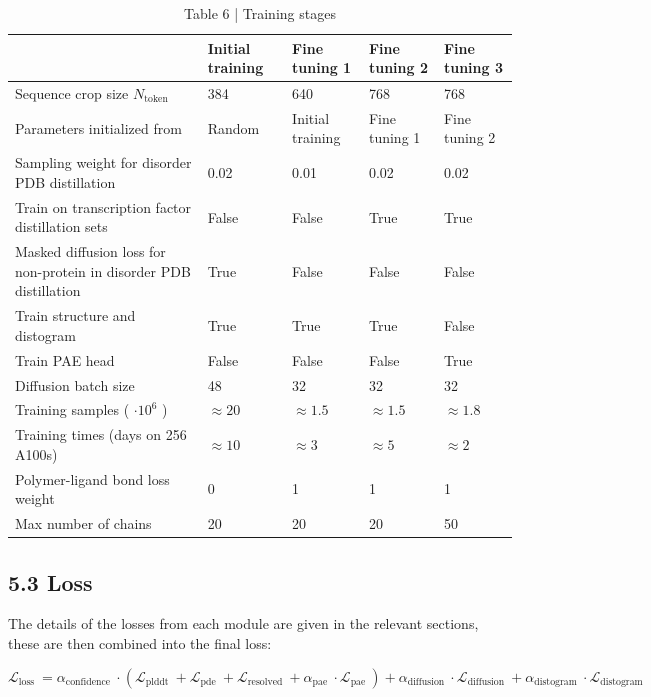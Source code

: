 \documentclass[10pt]{article}
\begin{document}
\begin{table}[h]
\begin{center}
\captionsetup{labelformat=empty}
\caption{Table 6 | Training stages}
\begin{tabular}{|l|l|l|l|l|}
\hline
 & Initial training & Fine tuning 1 & Fine tuning 2 & Fine tuning 3 \\
\hline
Sequence crop size $N_{\text {token }}$ & 384 & 640 & 768 & 768 \\
\hline
Parameters initialized from & Random & Initial training & Fine tuning 1 & Fine tuning 2 \\
\hline
Sampling weight for disorder PDB distillation & 0.02 & 0.01 & 0.02 & 0.02 \\
\hline
Train on transcription factor distillation sets & False & False & True & True \\
\hline
Masked diffusion loss for non-protein in disorder PDB distillation & True & False & False & False \\
\hline
Train structure and distogram & True & True & True & False \\
\hline
Train PAE head & False & False & False & True \\
\hline
Diffusion batch size & 48 & 32 & 32 & 32 \\
\hline
Training samples ( $\cdot 10^{6}$ ) & $\approx 20$ & $\approx 1.5$ & $\approx 1.5$ & $\approx 1.8$ \\
\hline
Training times (days on 256 A100s) & $\approx 10$ & $\approx 3$ & $\approx 5$ & $\approx 2$ \\
\hline
Polymer-ligand bond loss weight & 0 & 1 & 1 & 1 \\
\hline
Max number of chains & 20 & 20 & 20 & 50 \\
\hline
\end{tabular}
\end{center}
\end{table}

\subsection*{5.3 Loss}
The details of the losses from each module are given in the relevant sections, these are then combined into the final loss:


\begin{equation*}
\mathcal{L}_{\text {loss }}=\alpha_{\text {confidence }} \cdot\left(\mathcal{L}_{\text {plddt }}+\mathcal{L}_{\text {pde }}+\mathcal{L}_{\text {resolved }}+\alpha_{\text {pae }} \cdot \mathcal{L}_{\text {pae }}\right)+\alpha_{\text {diffusion }} \cdot \mathcal{L}_{\text {diffusion }}+\alpha_{\text {distogram }} \cdot \mathcal{L}_{\text {distogram }} \tag{15}
\end{equation*}
\end{document}
